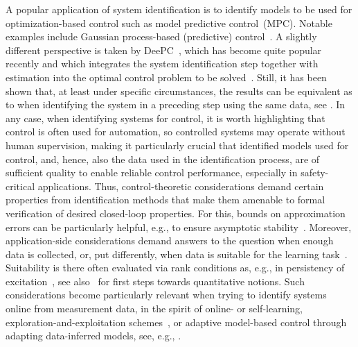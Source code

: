 \documentclass[a4paper, reqno]{amsart}
\begin{document}
A popular application of system identification is to identify models to be used for optimization-based control such as model predictive control~(MPC). 
Notable examples include Gaussian process-based (predictive) control~\cite{bradford2020stochastic,esch21gpmpc,lederer2025episodic}. 
A slightly different perspective is taken by DeePC~\cite{Coulson2019DeePC}, which has become quite popular recently and which integrates the system identification step together with estimation into the optimal control problem to be solved~\cite{willems2005note,faulwasser2023behavioral,chen2026deepc}. 
Still, it has been shown that, at least under specific circumstances, the results can be equivalent as to when identifying the system in a preceding step using the same data, see \cite{fiedler2021subscapedeepc}. 
In any case, when identifying systems for control, it is worth highlighting that control is often used for automation, so controlled systems may operate without human supervision, making it particularly crucial that identified models used for control, and, hence, also the data used in the identification process, are of sufficient quality to enable reliable control performance, especially in safety-critical applications. 
Thus, control-theoretic considerations demand certain properties from identification methods that make them amenable to formal verification of desired closed-loop properties. 
For this, bounds on approximation errors can be particularly helpful, e.g., to ensure asymptotic stability~\cite{schimperna2025data}.  
Moreover, application-side considerations demand answers to the question when enough data is collected, or, put differently, when data is suitable for the learning task~\cite{van2023informativity}. 
Suitability is there often evaluated via rank conditions as, e.g., in persistency of excitation~\cite{willems2005note}, see also~\cite{coulson2022quantitative,alsalti2023design} for first steps towards quantitative notions. 
Such considerations become particularly relevant when trying to identify systems online from measurement data, in the spirit of online- or self-learning, exploration-and-exploitation schemes~\cite{manz20mpclearnonline,esch23exploreexploit}, or adaptive model-based control through adapting data-inferred models, see, e.g., \cite{bold2025two}. 
\end{document}
